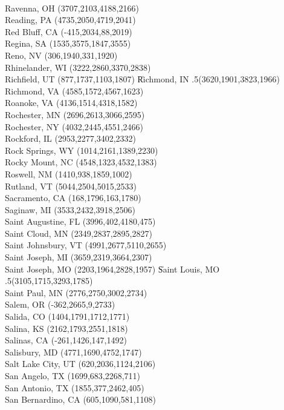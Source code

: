 \vglue 2in
\noindent
\\Ravenna, OH (3707,2103,4188,2166)
\\Reading, PA (4735,2050,4719,2041)
\\Red Bluff, CA (-415,2034,88,2019)
\\Regina, SA (1535,3575,1847,3555)
\\Reno, NV (306,1940,331,1920)
\\Rhinelander, WI  (3222,2860,3370,2838)
\\Richfield, UT  (877,1737,1103,1807)
\|Richmond, IN .5(3620,1901,3823,1966)
\\Richmond, VA (4585,1572,4567,1623)
\\Roanoke, VA  (4136,1514,4318,1582)
\\Rochester, MN  (2696,2613,3066,2595)
\\Rochester, NY (4032,2445,4551,2466)
\\Rockford, IL (2953,2277,3402,2332)
\\Rock Springs, WY (1014,2161,1389,2230)
\\Rocky Mount, NC  (4548,1323,4532,1383)
\\Roswell, NM (1410,938,1859,1002)
\\Rutland, VT  (5044,2504,5015,2533)
\\Sacramento, CA (168,1796,163,1780)
\\Saginaw, MI  (3533,2432,3918,2506)
\\Saint Augustine, FL  (3996,402,4180,475)
\\Saint Cloud, MN  (2349,2837,2895,2827)
\\Saint Johnsbury, VT  (4991,2677,5110,2655)
\\Saint Joseph, MI (3659,2319,3664,2307)
\\Saint Joseph, MO (2203,1964,2828,1957)
\|Saint Louis, MO .5(3105,1715,3293,1785)
\\Saint Paul, MN  (2776,2750,3002,2734)
\\Salem, OR (-362,2665,9,2733)
\\Salida, CO (1404,1791,1712,1771)
\\Salina, KS (2162,1793,2551,1818)
\\Salinas, CA (-261,1426,147,1492)
\\Salisbury, MD (4771,1690,4752,1747)
\\Salt Lake City, UT (620,2036,1124,2106)
\\San Angelo, TX (1699,683,2268,711)
\\San Antonio, TX (1855,377,2462,405)
\\San Bernardino, CA  (605,1090,581,1108)
